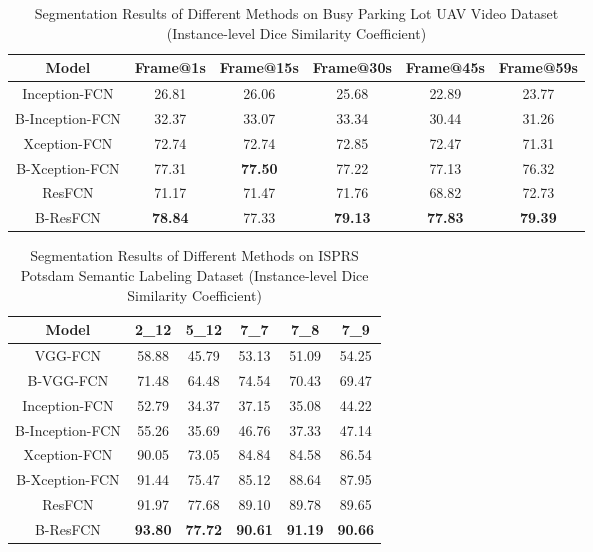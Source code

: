 \documentclass[journal]{IEEEtran}
\begin{document}
\begin{table*}[t]
\caption{\label{tab:seg_parkinglot} Segmentation Results of Different Methods on Busy Parking Lot UAV Video Dataset (Instance-level Dice Similarity Coefficient)}
\centering
\begin{tabular}{cccccc}
\toprule
\textbf{Model} & \textbf{Frame@1s} & \textbf{Frame@15s} & \textbf{Frame@30s} & \textbf{Frame@45s} & \textbf{Frame@59s} \\
\hline
Inception-FCN & 26.81 & 26.06 & 25.68 & 22.89 & 23.77 \\
B-Inception-FCN & 32.37 & 33.07 & 33.34 & 30.44 & 31.26 \\
Xception-FCN & 72.74 & 72.74 & 72.85 & 72.47 & 71.31 \\
B-Xception-FCN & 77.31 & \textbf{77.50} & 77.22 & 77.13 & 76.32 \\
ResFCN & 71.17 & 71.47 & 71.76 & 68.82 & 72.73 \\
B-ResFCN & \textbf{78.84} & 77.33 & \textbf{79.13} & \textbf{77.83} & \textbf{79.39} \\
\bottomrule
\end{tabular}
\end{table*}

\begin{table}[t]
\caption{\label{tab:seg_potsdam} Segmentation Results of Different Methods on ISPRS Potsdam Semantic Labeling Dataset (Instance-level Dice Similarity Coefficient)}
\centering
\begin{tabular}{cccccc}
\toprule
\textbf{Model} & \textbf{2\_12} & \textbf{5\_12} & \textbf{7\_7} & \textbf{7\_8} & \textbf{7\_9} \\
\hline
VGG-FCN & 58.88 & 45.79 & 53.13 & 51.09 & 54.25 \\
B-VGG-FCN & 71.48 & 64.48 & 74.54 & 70.43 & 69.47 \\
Inception-FCN & 52.79 & 34.37 & 37.15 & 35.08 & 44.22 \\
B-Inception-FCN & 55.26 & 35.69 & 46.76 & 37.33 & 47.14 \\
Xception-FCN & 90.05 & 73.05 & 84.84 & 84.58 & 86.54 \\
B-Xception-FCN & 91.44 & 75.47 & 85.12 & 88.64 & 87.95 \\
ResFCN & 91.97 & 77.68 & 89.10 & 89.78 & 89.65 \\
B-ResFCN & \textbf{93.80} & \textbf{77.72} & \textbf{90.61} & \textbf{91.19} & \textbf{90.66} \\
\bottomrule
\end{tabular}
\end{table}
\end{document}
